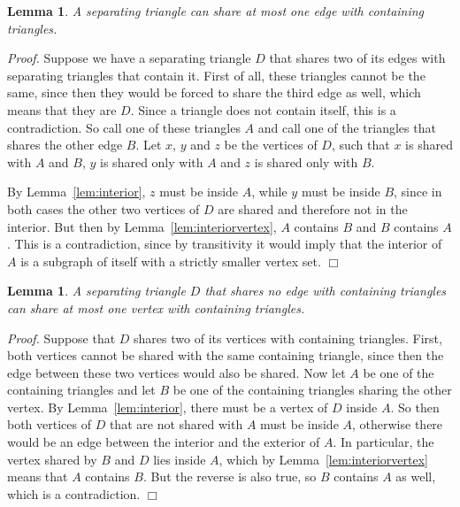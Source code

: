 \pdfoutput=1 \documentclass[12pt]{elsarticle}
\newtheorem{lem}[defin]{Lemma}
\newenvironment{lemma}{\begin{lem} \sl}{\end{lem}}
\newenvironment{proof}{\emph{Proof.}}{\hfill $\Box$ \medskip\\}
\begin{document}
\vspace{-0.5em}
\begin{lemma}
 \label{lem:onecontainingtriangle}
 A separating triangle can share at most one edge with containing triangles.
\end{lemma}
\begin{proof}
 Suppose we have a separating triangle $D$ that shares two of its edges with separating triangles that contain it. First of all, these triangles cannot be the same, since then they would be forced to share the third edge as well, which means that they are $D$. Since a triangle does not contain itself, this is a contradiction. So call one of these triangles $A$ and call one of the triangles that shares the other edge $B$. Let $x$, $y$ and $z$ be the vertices of $D$, such that $x$ is shared with $A$ and $B$, $y$ is shared only with $A$ and $z$ is shared only with $B$.

 By Lemma~\ref{lem:interior}, $z$ must be inside $A$, while $y$ must be inside $B$, since in both cases the other two vertices of $D$ are shared and therefore not in the interior. But then by Lemma~\ref{lem:interiorvertex}, $A$ contains $B$ and $B$ contains $A$. This is a contradiction, since by transitivity it would imply that the interior of $A$ is a subgraph of itself with a strictly smaller vertex set.
\end{proof}
\vspace{-0.5em}
\begin{lemma}
 \label{lem:onecontaining}
 A separating triangle $D$ that shares no edge with containing triangles can share at most one vertex with containing triangles.
\end{lemma}
\begin{proof}
 Suppose that $D$ shares two of its vertices with containing triangles. First, both vertices cannot be shared with the same containing triangle, since then the edge between these two vertices would also be shared. Now let $A$ be one of the containing triangles and let $B$ be one of the containing triangles sharing the other vertex. By Lemma~\ref{lem:interior}, there must be a vertex of $D$ inside $A$. So then both vertices of $D$ that are not shared with $A$ must be inside $A$, otherwise there would be an edge between the interior and the exterior of $A$. In particular, the vertex shared by $B$ and $D$ lies inside $A$, which by Lemma~\ref{lem:interiorvertex} means that $A$ contains $B$. But the reverse is also true, so $B$ contains $A$ as well, which is a contradiction.
\end{proof}
\end{document}
